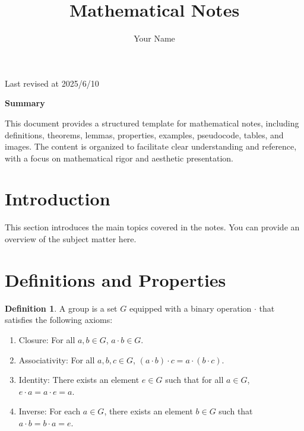 \documentclass[11pt, a4paper]{article}
\author{Your Name}
\title{Mathematical Notes}
\theoremstyle{plain}
\theoremstyle{definition}
\newtheorem{definition}[theorem]{Definition}
\begin{document}
	
	\begin{titlepage}
		\centering
		\vspace*{2cm}
		{\Huge\bfseries \thetitle \par}
		\vspace{1cm}
		{\Large \theauthor \par}
		\vspace{0.5cm}
		{\large Last revised at 2025/6/10 \par}
		\vspace{3.5cm} %
		{\large\bfseries Summary \par}
		\vspace{0.5cm}
		This document provides a structured template for mathematical notes, including definitions, theorems, lemmas, properties, examples, pseudocode, tables, and images. The content is organized to facilitate clear understanding and reference, with a focus on mathematical rigor and aesthetic presentation.
	\end{titlepage}
	
	\section{Introduction}
	This section introduces the main topics covered in the notes. You can provide an overview of the subject matter here.
	
	\section{Definitions and Properties}
	\begin{definition}
		A group is a set \( G \) equipped with a binary operation \( \cdot \) that satisfies the following axioms:
		\begin{enumerate}[label=\roman*.]
			\item Closure: For all \( a, b \in G \), \( a \cdot b \in G \).
			\item Associativity: For all \( a, b, c \in G \), \( (a \cdot b) \cdot c = a \cdot (b \cdot c) \).
			\item Identity: There exists an element \( e \in G \) such that for all \( a \in G \), \( e \cdot a = a \cdot e = a \).
			\item Inverse: For each \( a \in G \), there exists an element \( b \in G \) such that \( a \cdot b = b \cdot a = e \).
		\end{enumerate}
	\end{definition}
	
\end{document}
